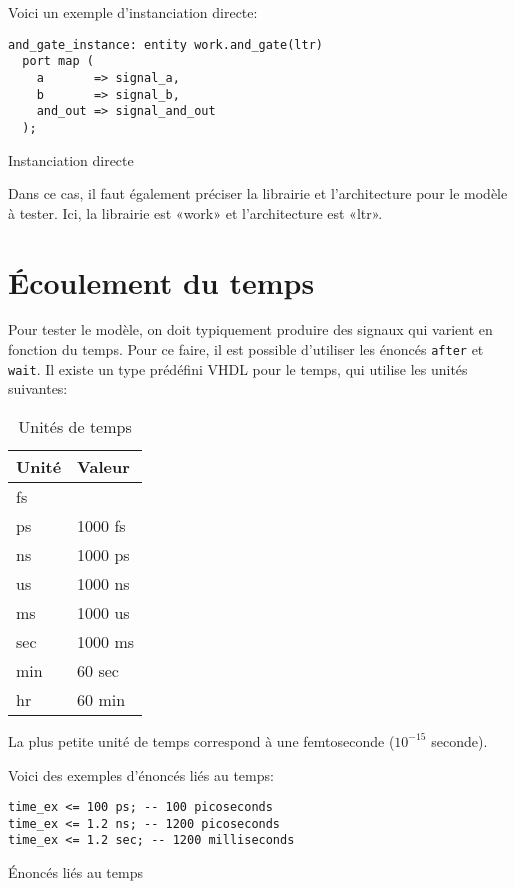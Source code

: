 \documentclass[letter, oneside]{book}
\begin{document}
Voici un exemple d'instanciation directe:

\begin{listing}[htbp]
\begin{verbatim}
and_gate_instance: entity work.and_gate(ltr)
  port map (
    a       => signal_a,
    b       => signal_b,
    and_out => signal_and_out
  );
\end{verbatim}
\caption{Instanciation directe}
\end{listing}

Dans ce cas, il faut également préciser la librairie et l'architecture
pour le modèle à tester. Ici, la librairie est «work» et
l'architecture est «ltr».

\section{Écoulement du temps}
\label{sec:org3d631be}

Pour tester le modèle, on doit typiquement produire des signaux qui
varient en fonction du temps. Pour ce faire, il est possible
d'utiliser les énoncés \texttt{after} et \texttt{wait}. Il existe un type prédéfini
VHDL pour le temps, qui utilise les unités suivantes:

\begin{table}[htbp]
\caption{\label{tab:org2878254}Unités de temps}
\centering
\begin{tabular}{ll}
Unité & Valeur\\[0pt]
\hline
fs & \\[0pt]
ps & 1000 fs\\[0pt]
ns & 1000 ps\\[0pt]
us & 1000 ns\\[0pt]
ms & 1000 us\\[0pt]
sec & 1000 ms\\[0pt]
min & 60 sec\\[0pt]
hr & 60 min\\[0pt]
\end{tabular}
\end{table}

La plus petite unité de temps correspond à une femtoseconde (\(10^{-15}\) seconde).

Voici des exemples d'énoncés liés au temps:

\begin{listing}[htbp]
\begin{verbatim}
time_ex <= 100 ps; -- 100 picoseconds 
time_ex <= 1.2 ns; -- 1200 picoseconds
time_ex <= 1.2 sec; -- 1200 milliseconds
\end{verbatim}
\caption{Énoncés liés au temps}
\end{listing}
\end{document}
